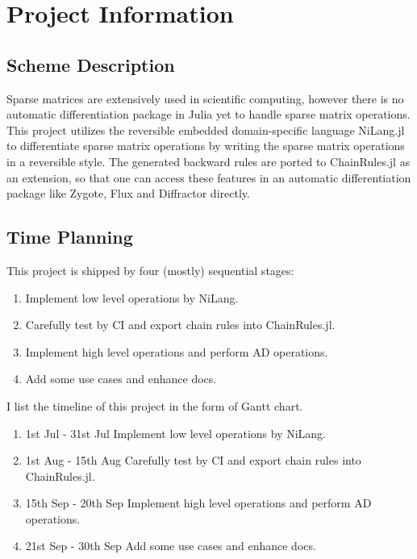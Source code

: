

\section{Project Information}
\subsection{Scheme Description}
Sparse matrices are extensively used in scientific computing, however there is no automatic differentiation package in Julia yet to handle sparse matrix operations. This project utilizes the reversible embedded domain-specific language NiLang.jl to differentiate sparse matrix operations by writing the sparse matrix operations in a reversible style. The generated backward rules are ported to ChainRules.jl as an extension, so that one can access these features in an automatic differentiation package like Zygote, Flux and Diffractor directly.
\subsection{Time Planning}

This project is shipped by four (mostly) sequential stages:
\begin{enumerate}[(1)]
    \item Implement low level operations by NiLang.
    \item Carefully test by CI and export chain rules into ChainRules.jl. 
    \item Implement high level operations and perform AD operations.
    \item Add some use cases and enhance docs. 
\end{enumerate}

I list the timeline of this project in the form of Gantt chart.
\begin{enumerate}[(1)]
    \item 1st Jul - 31st Jul \quad Implement low level operations by NiLang. 
    \item 1st Aug - 15th Aug   \quad Carefully test by CI and export chain rules into ChainRules.jl.
    \item 15th Sep - 20th Sep \quad  Implement high level operations and perform AD operations. 
    \item 21st Sep - 30th Sep \quad Add some use cases and enhance docs.
\end{enumerate}
\vspace{0.5cm}

